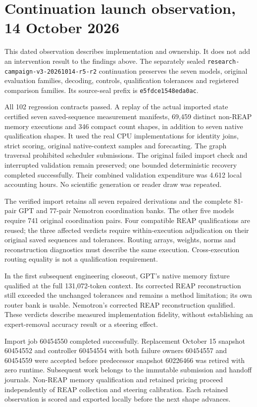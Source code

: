 \section{Continuation launch observation, 14 October 2026}
This dated observation describes implementation and ownership. It does not add
an intervention result to the findings above. The separately sealed
\texttt{research-campaign-v3-20261014-r5-r2} continuation preserves the seven
models, original evaluation families, decoding, controls, qualification tolerances
and registered comparison families. Its source-seal prefix is
\texttt{e5fdce1548eda0ac}.

All 102 regression contracts passed. A replay of the actual imported state
certified seven saved-sequence measurement manifests, 69,459 distinct non-REAP
memory executions and 346 compact count shapes, in addition to seven native
qualification shapes. It used the real CPU implementations for identity joins,
strict scoring, original native-context samples and forecasting. The graph
traversal prohibited scheduler submissions. The original failed import check
and interrupted validation remain preserved; one bounded deterministic recovery
completed successfully. Their combined validation expenditure was 4.612 local
accounting hours. No scientific generation or reader draw was repeated.

The verified import retains all seven repaired derivations and the complete
81-pair GPT and 77-pair Nemotron coordination banks. The other five models
require 741 original coordination pairs. Four compatible REAP qualifications
are reused; the three affected verdicts require within-execution adjudication
on their original saved sequences and tolerances. Routing arrays, weights,
norms and reconstruction diagnostics must describe the same execution.
Cross-execution routing equality is not a qualification requirement.

In the first subsequent engineering closeout, GPT's native memory fixture
qualified at the full 131,072-token context. Its corrected REAP reconstruction
still exceeded the unchanged tolerances and remains a method limitation;
its own router bank is usable. Nemotron's corrected REAP reconstruction
qualified. These verdicts describe measured implementation fidelity, without
establishing an expert-removal accuracy result or a steering effect.

Import job 60454550 completed successfully. Replacement October 15 snapshot
60454552 and controller 60454554 with both failure owners 60454557 and 60454559
were accepted before predecessor snapshot 60226466 was retired with zero runtime.
Subsequent work belongs to the immutable submission and handoff journals.
Non-REAP memory qualification and retained pricing proceed independently of
REAP collection and steering calibration. Each retained observation is scored
and exported locally before the next shape advances.

